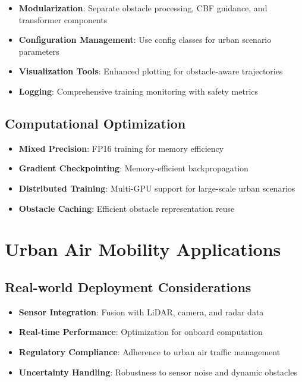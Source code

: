 \documentclass[12pt]{article}
\begin{document}
\begin{itemize}
    \item \textbf{Modularization}: Separate obstacle processing, CBF guidance, and transformer components
    \item \textbf{Configuration Management}: Use config classes for urban scenario parameters
    \item \textbf{Visualization Tools}: Enhanced plotting for obstacle-aware trajectories
    \item \textbf{Logging}: Comprehensive training monitoring with safety metrics
\end{itemize}

\subsection{Computational Optimization}

\begin{itemize}
    \item \textbf{Mixed Precision}: FP16 training for memory efficiency
    \item \textbf{Gradient Checkpointing}: Memory-efficient backpropagation
    \item \textbf{Distributed Training}: Multi-GPU support for large-scale urban scenarios
    \item \textbf{Obstacle Caching}: Efficient obstacle representation reuse
\end{itemize}

\section{Urban Air Mobility Applications}

\subsection{Real-world Deployment Considerations}

\begin{itemize}
    \item \textbf{Sensor Integration}: Fusion with LiDAR, camera, and radar data
    \item \textbf{Real-time Performance}: Optimization for onboard computation
    \item \textbf{Regulatory Compliance}: Adherence to urban air traffic management
    \item \textbf{Uncertainty Handling}: Robustness to sensor noise and dynamic obstacles
\end{itemize}
\end{document}
